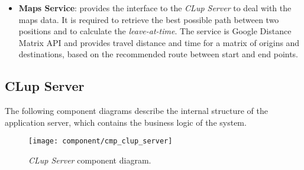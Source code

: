 \begin{itemize}
	\item \textbf{Maps Service}: provides the interface to the \textit{CLup Server} to deal with the maps data. It is required to retrieve the best possible path between two positions and to calculate the \textit{leave-at-time}.\newline
	The service is Google Distance Matrix API and provides travel distance and time for a matrix of origins and destinations, based on the recommended route between start and end points.
\end{itemize}

\clearpage

\subsection{CLup Server}
The following component diagrams describe the internal structure of the application server, which contains the business logic of the system.

\begin{figure}[H]
	\centering
	\texttt{[image: component/cmp\_clup\_server]}
	\caption{\textit{CLup Server} component diagram.}
	\label{fig:cmp_clup_server}
\end{figure}
\clearpage

